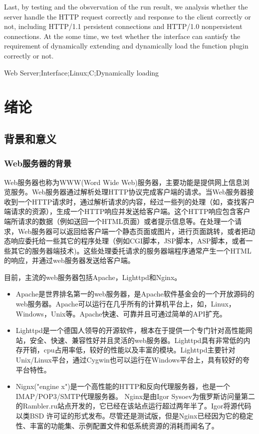 \documentclass[twoside, xetex]{report}
\begin{document}
	Last, by testing and the obsvervation of the run result, we analysis whether the server handle the HTTP request correctly and response to the client correctly or not, including HTTP/1.1 persistent connections and HTTP/1.0 nonpersistent connections. At the some time, we test whether the interface can santisfy the requirement of dynamically extending and dynamically load the function plugin correctly or not. 


{\enkeywords Web Server;Interface;Linux;C;Dynamically loading}

\tableofcontents

\chapter{绪论}
\setcounter{page}{1}

\section{背景和意义}
\subsection{Web服务器的背景}
	Web服务器也称为WWW(Word Wide Web)服务器，主要功能是提供网上信息浏览服务。Web服务器通过解析处理HTTP协议完成客户端的请求。当Web服务器接收到一个HTTP请求时，通过解析请求的内容，经过一些列的处理（如，查找客户端请求的资源），生成一个HTTP响应并发送给客户端。这个HTTP响应包含客户端所请求的数据（例如送回一个HTML页面）或者提示信息等。在处理一个请求，Web服务器可以返回给客户端一个静态页面或图片，进行页面跳转，或者把动态响应委托给一些其它的程序处理（例如CGI脚本，JSP脚本，ASP脚本，或者一些其它的服务器端技术)。这些处理委托请求的服务器端程序通常产生一个HTML的响应，并通过web服务器发送给客户端。
	
	目前，主流的web服务器包括Apache，Lighttpd和Nginx。
	\begin{itemize}
		\item Apache是世界排名第一的web服务器，是Apache软件基金会的一个开放源码的web服务器。Apache可以运行在几乎所有的计算机平台上，如，Linux，Windows，Unix等。Apache快速、可靠并且可通过简单的API扩充。
		\item Lighttpd是一个德国人领导的开源软件，根本在于提供一个专门针对高性能网站，安全、快速、兼容性好并且灵活的web服务器。Lighttpd具有非常低的内存开销，cpu占用率低，较好的性能以及丰富的模块。Lighttpd主要针对Unix/Linux平台，通过Cygwin也可以运行在Windows平台上，具有较好的夸平台特性。
		\item Nignx("engine x")是一个高性能的HTTP和反向代理服务器，也是一个IMAP/POP3/SMTP代理服务器。 Nginx是由Igor Sysoev为俄罗斯访问量第二的Rambler.ru站点开发的，它已经在该站点运行超过两年半了。Igor将源代码以类BSD 许可证的形式发布。尽管还是测试版，但是Nginx已经因为它的稳定性、丰富的功能集、示例配置文件和低系统资源的消耗而闻名了。
	\end{itemize}
	
\end{document}
